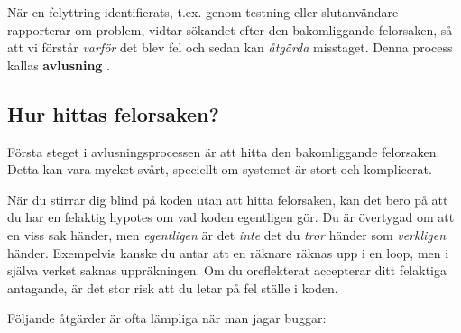 När en felyttring identifierats, t.ex. genom testning eller slutanvändare rapporterar om problem, vidtar sökandet efter den bakomliggande felorsaken, så att vi förstår \emph{varför} det blev fel och sedan kan \emph{åtgärda} misstaget. Denna process kallas \textbf{avlusning} .




\subsection{Hur hittas felorsaken?}

Första steget i avlusningsprocessen är att hitta den bakomliggande felorsaken. Detta kan vara mycket svårt, speciellt om systemet är stort och komplicerat.

När du stirrar dig blind på koden utan att hitta felorsaken, kan det bero på att du har en felaktig hypotes om vad koden egentligen gör. Du är övertygad om att en viss sak händer, men \emph{egentligen} är det \emph{inte} det du \emph{tror} händer som \emph{verkligen} händer. Exempelvis kanske du antar att en räknare räknas upp i en loop, men i själva verket saknas uppräkningen. Om du oreflekterat accepterar ditt felaktiga antagande, är det stor risk att du letar på fel ställe i koden.

Följande åtgärder är ofta lämpliga när man jagar buggar:


